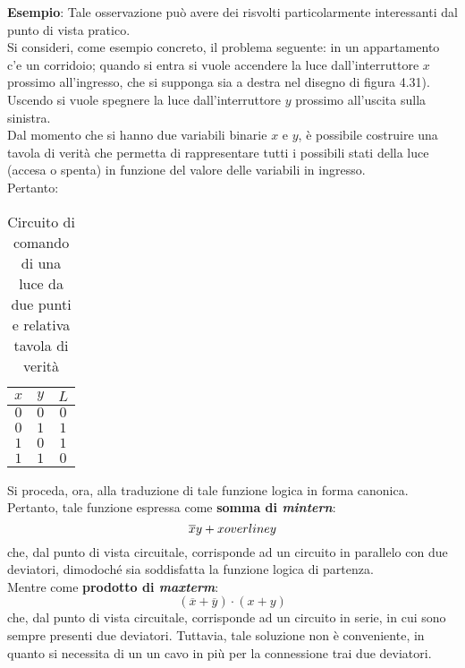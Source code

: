 \documentclass[a4paper]{extarticle}
\begin{document}
\vspace{1em}
\noindent
\textbf{Esempio}: Tale osservazione può avere dei risvolti particolarmente interessanti dal punto di vista pratico.\\
Si consideri, come esempio concreto, il problema seguente: in un appartamento c’e un corridoio; quando si entra si vuole accendere la luce dall’interruttore \(x\) prossimo all’ingresso, che si supponga sia a destra nel disegno di figura 4.31). Uscendo si vuole spegnere la luce dall’interruttore \(y\) prossimo all’uscita sulla sinistra.\\
Dal momento che si hanno due variabili binarie \(x\) e \(y\), è possibile costruire una tavola di verità che permetta di rappresentare tutti i possibili stati della luce (accesa o spenta) in funzione del valore delle variabili in ingresso.\\
Pertanto:

\begin{table}[H]
    \centering
    \begin{tabular}{cc|c}
         \(x\) & \(y\) & \(L\)\\
         \hline
         \(0\) & \(0\) & \(0\)\\
         \(0\) & \(1\) & \(1\)\\
         \(1\) & \(0\) & \(1\)\\
         \(1\) & \(1\) & \(0\)\\
    \end{tabular}
    \caption{Circuito di comando di una luce da due punti e relativa tavola di verità}
    \label{tab:circuito_luce_due_punti_tavola_verita}
\end{table}

\vspace{1em}
\noindent
Si proceda, ora, alla traduzione di tale funzione logica in forma canonica. Pertanto, tale funzione espressa come \textbf{somma di \textit{mintern}}:
\[\overline{x}y + x\\overline{y}\]
che, dal punto di vista circuitale, corrisponde ad un circuito in parallelo con due deviatori, dimodoché sia soddisfatta la funzione logica di partenza.\\
Mentre come \textbf{prodotto di \textit{maxterm}}:
\[(\overline{x} + \overline{y}) \cdot (x + y)\]
che, dal punto di vista circuitale, corrisponde ad un circuito in serie, in cui sono sempre presenti due deviatori. Tuttavia, tale soluzione non è conveniente, in
quanto si necessita di un un cavo in più per la connessione trai due deviatori.
\end{document}
